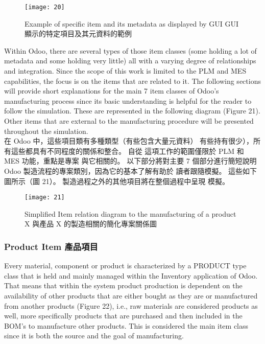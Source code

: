 \begin{figure}[hbt!]
\begin{center}
\texttt{[image: 20]}
\caption{\Large Example of specific item and its metadata as displayed by GUI GUI 顯示的特定項目及其元資料的範例}\label{fig.20}
\end{center}
\end{figure}


\fontsize{12}{2.5pt}\sectionef 
 {Within Odoo, there are several types of those item classes (some holding a lot of metadata
and some holding very little) all with a varying degree of relationships and integration. Since
the scope of this work is limited to the PLM and MES capabilities, the focus is on the items
that are related to it. The following sections will provide short explanations for the main 7
item classes of Odoo’s manufacturing process since its basic understanding is helpful for the
reader to follow the simulation. These are represented in the following diagram (Figure 21).
Other items that are external to the manufacturing procedure will be presented throughout
the simulation.}\\[1pt]

\fontsize{12}{2.5pt}\sectionef  
{在 Odoo 中，這些項目類有多種類型（有些包含大量元資料）
有些持有很少），所有這些都具有不同程度的關係和整合。 自從
這項工作的範圍僅限於 PLM 和 MES 功能，重點是專案
與它相關的。 以下部分將對主要 7 個部分進行簡短說明
Odoo 製造流程的專案類別，因為它的基本了解有助於
讀者跟隨模擬。 這些如下圖所示（圖 21）。
製造過程之外的其他項目將在整個過程中呈現
模擬。}\\[15pt]


\begin{figure}[hbt!]
\begin{center}
\texttt{[image: 21]}
\caption{\Large Simplified Item relation diagram to the manufacturing of a product X  與產品 X 的製造相關的簡化專案關係圖}\label{fig.21}
\end{center}
\end{figure}



\subsubsection{Product Item 產品項目 }

\fontsize{12}{2.5pt}\sectionef 
 {Every material, component or product is characterized by a PRODUCT type class that is
held and mainly managed within the Inventory application of Odoo. That means that within
the system product production is dependent on the availability of other products that are
either bought as they are or manufactured from another products (Figure 22), i.e., raw
materials are considered products as well, more specifically products that are purchased and
then included in the BOM’s to manufacture other products. This is considered the main item
class since it is both the source and the goal of manufacturing.
}\\[1pt]

